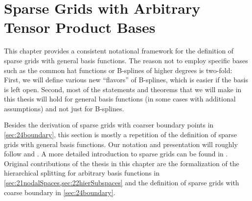 
\chapter{Sparse Grids with Arbitrary Tensor Product Bases}
\label{chap:20sparseGrids}


This chapter provides a consistent notational framework
for the definition of sparse grids with general basis functions.
The reason not to employ specific bases such as the common hat functions
or B-splines of higher degrees is two-fold:
First, we will define various new ``flavors'' of B-splines,
which is easier if the basis is left open.
Second, most of the statements and theorems that we will make in this
thesis will hold for general basis functions
(in some cases with additional assumptions)
and not just for B-splines.

Besides the derivation of sparse grids with
coarser boundary points in \cref{sec:24boundary},
this section is mostly
a repetition of the definition of sparse grids with general basis functions.
Our notation and presentation will roughly follow
\cite{Pflueger10Spatially} and \cite{Garcke13Sparse}.
A more detailed introduction to sparse grids can be found in
\cite{Bungartz04Sparse}.
Original contributions of the thesis in this chapter
are the formalization of the hierarchical splitting for
arbitrary basis functions in \cref{sec:21nodalSpaces,sec:22hierSubspaces} and
the definition of sparse grids with coarse boundary in \cref{sec:24boundary}.








\cleardoublepage
